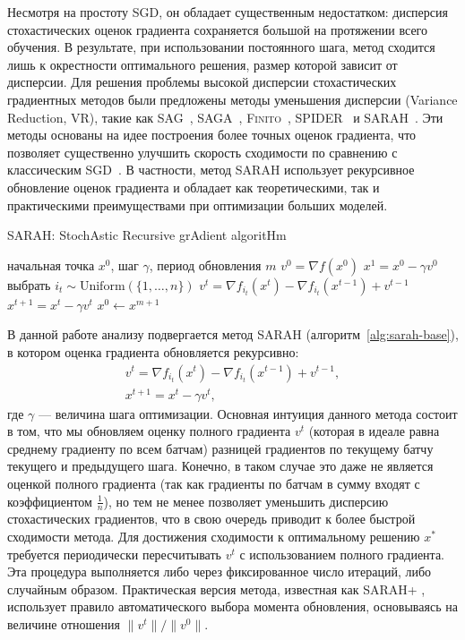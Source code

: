 Несмотря на простоту \textsc{SGD}, он обладает существенным недостатком: дисперсия стохастических оценок градиента сохраняется большой на протяжении всего обучения. В результате, при использовании постоянного шага, метод сходится лишь к окрестности оптимального решения, размер которой зависит от дисперсии. Для решения проблемы высокой дисперсии стохастических градиентных методов были предложены методы уменьшения дисперсии (Variance Reduction, VR), такие как \textsc{SAG}~\cite{schmidt2017minimizing}, \textsc{SAGA}~\cite{defazio2014saga}, \textsc{Finito}~\cite{defazio2014finito}, \textsc{SPIDER}~\cite{fang2018spider} и \textsc{SARAH}~\cite{nguyen2017sarah}. Эти методы основаны на идее построения более точных оценок градиента, что позволяет существенно улучшить скорость сходимости по сравнению с классическим \textsc{SGD}~\cite{robbins1951stochastic}. В частности, метод \textsc{SARAH} использует рекурсивное обновление оценок градиента и обладает как теоретическими, так и практическими преимуществами при оптимизации больших моделей. 
\begin{algorithm}[H]
\caption{\textsc{SARAH}: StochAstic Recursive grAdient algoritHm}
\label{alg:sarah-base}
\begin{algorithmic}[1]
\Require начальная точка $x^0$, шаг $\gamma$, период обновления $m$
    \State $v^0 = \nabla f(x^0)$
    \State $x^1 = x^0 - \gamma v^0$
        \State выбрать $i_t \sim \mathrm{Uniform}(\{1, \dots, n\})$
        \State $v^t = \nabla f_{i_t}(x^t) - \nabla f_{i_t}(x^{t-1}) + v^{t-1}$
        \State $x^{t+1} = x^t - \gamma v^t$
    \EndFor
    \State $x^0 \gets x^{m+1}$ 
\EndFor
\end{algorithmic}
\end{algorithm}

\vspace{1ex}

В данной работе анализу подвергается метод \textsc{SARAH} (алгоритм~\ref{alg:sarah-base}), в котором оценка градиента обновляется рекурсивно:
\begin{gather*}
v^t = \nabla f_{i_t} (x^t) - \nabla f_{i_t} (x^{t-1}) + v^{t-1}, \\ x^{t+1} = x^t - \gamma v^t,
\end{gather*}
где $\gamma$ — величина шага оптимизации. Основная интуиция данного метода состоит в том, что мы обновляем оценку полного градиента $v^t$ (которая в идеале равна среднему градиенту по всем батчам) разницей градиентов по текущему батчу текущего и предыдущего шага. Конечно, в таком случае это даже не является оценкой полного градиента (так как градиенты по батчам в сумму входят с коэффициентом $\frac{1}{n}$), но тем не менее позволяет уменьшить дисперсию стохастических градиентов, что в свою очередь приводит к более быстрой сходимости метода.
Для достижения сходимости к оптимальному решению $x^*$ требуется периодически пересчитывать $v^t$ с использованием полного градиента. Эта процедура выполняется либо через фиксированное число итераций, либо случайным образом. Практическая версия метода, известная как \textsc{SARAH+} \citep{nguyen2017sarah}, использует правило автоматического выбора момента обновления, основываясь на величине отношения $\|v^t\|/\|v^0\|$.

